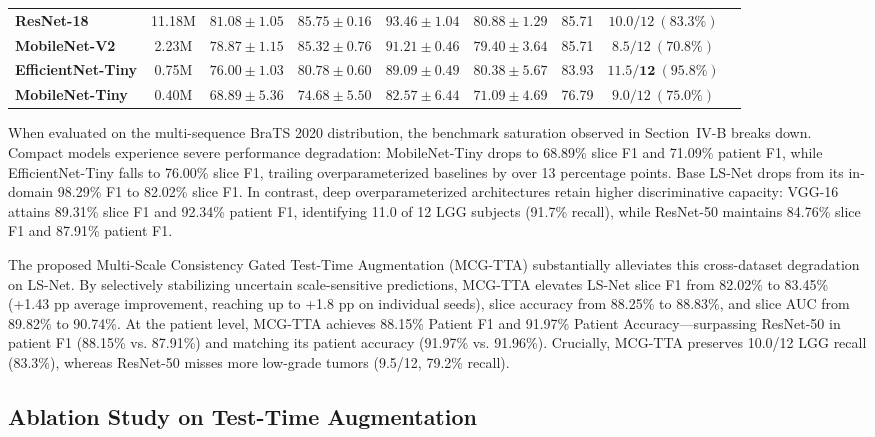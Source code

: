 \begin{table}[t]
{\begin{tabular}{lcccccccc}
\textbf{ResNet-18} \cite{10} & 11.18M & $81.08 \pm 1.05$ & $85.75 \pm 0.16$ & $93.46 \pm 1.04$ & $80.88 \pm 1.29$ & 85.71 & $10.0 / 12\ (83.3\%)$ \\
\textbf{MobileNet-V2} \cite{27} & 2.23M & $78.87 \pm 1.15$ & $85.32 \pm 0.76$ & $91.21 \pm 0.46$ & $79.40 \pm 3.64$ & 85.71 & $8.5 / 12\ (70.8\%)$ \\
\textbf{EfficientNet-Tiny} & 0.75M & $76.00 \pm 1.03$ & $80.78 \pm 0.60$ & $89.09 \pm 0.49$ & $80.38 \pm 5.67$ & 83.93 & $\mathbf{11.5 / 12\ (95.8\%)}$ \\
\textbf{MobileNet-Tiny} & 0.40M & $68.89 \pm 5.36$ & $74.68 \pm 5.50$ & $82.57 \pm 6.44$ & $71.09 \pm 4.69$ & 76.79 & $9.0 / 12\ (75.0\%)$ \\
\bottomrule
\end{tabular}}
\end{table}

When evaluated on the multi-sequence BraTS 2020 distribution, the benchmark saturation observed in Section~IV-B breaks down. Compact models experience severe performance degradation: MobileNet-Tiny drops to 68.89\% slice F1 and 71.09\% patient F1, while EfficientNet-Tiny falls to 76.00\% slice F1, trailing overparameterized baselines by over 13 percentage points. Base LS-Net drops from its in-domain 98.29\% F1 to 82.02\% slice F1. In contrast, deep overparameterized architectures retain higher discriminative capacity: VGG-16 attains 89.31\% slice F1 and 92.34\% patient F1, identifying 11.0 of 12 LGG subjects (91.7\% recall), while ResNet-50 maintains 84.76\% slice F1 and 87.91\% patient F1.

The proposed Multi-Scale Consistency Gated Test-Time Augmentation (MCG-TTA) substantially alleviates this cross-dataset degradation on LS-Net. By selectively stabilizing uncertain scale-sensitive predictions, MCG-TTA elevates LS-Net slice F1 from 82.02\% to 83.45\% (+1.43 pp average improvement, reaching up to +1.8 pp on individual seeds), slice accuracy from 88.25\% to 88.83\%, and slice AUC from 89.82\% to 90.74\%. At the patient level, MCG-TTA achieves 88.15\% Patient F1 and 91.97\% Patient Accuracy---surpassing ResNet-50 in patient F1 (88.15\% vs. 87.91\%) and matching its patient accuracy (91.97\% vs. 91.96\%). Crucially, MCG-TTA preserves 10.0/12 LGG recall (83.3\%), whereas ResNet-50 misses more low-grade tumors (9.5/12, 79.2\% recall).

\subsection{Ablation Study on Test-Time Augmentation}

